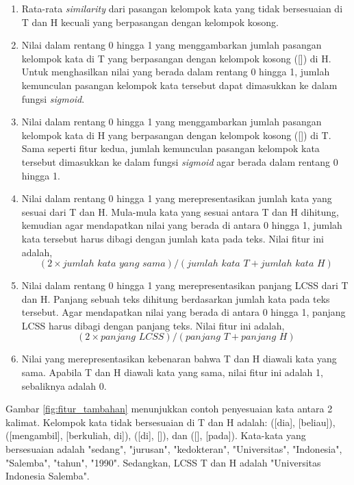 	\begin{enumerate}
		\item Rata-rata \textit{similarity} dari pasangan kelompok kata yang tidak bersesuaian di T dan H kecuali yang berpasangan dengan kelompok kosong. 		
		\item Nilai dalam rentang 0 hingga 1 yang menggambarkan jumlah pasangan kelompok kata di T yang berpasangan dengan kelompok kosong ([]) di H. Untuk menghasilkan nilai yang berada dalam rentang 0 hingga 1, jumlah kemunculan pasangan kelompok kata tersebut dapat dimasukkan ke dalam fungsi \textit{sigmoid}.
		\item Nilai dalam rentang 0 hingga 1 yang menggambarkan jumlah pasangan kelompok kata di H yang berpasangan dengan kelompok kosong ([]) di T. Sama seperti fitur kedua, jumlah kemunculan pasangan kelompok kata tersebut dimasukkan ke dalam fungsi \textit{sigmoid} agar berada dalam rentang 0 hingga 1. 
		\item Nilai dalam rentang 0 hingga 1 yang merepresentasikan jumlah kata yang sesuai dari T dan H. Mula-mula kata yang sesuai antara T dan H dihitung, kemudian agar mendapatkan nilai yang berada di antara 0 hingga 1, jumlah kata tersebut harus dibagi dengan jumlah kata pada teks. Nilai fitur ini adalah,
		\begin{equation}
		(2 \times jumlah\,\,kata\,\,yang\,\,sama)/(jumlah\,\,kata\,\,T + jumlah\,\,kata\,\,H)
		\end{equation}
		\item Nilai dalam rentang 0 hingga 1 yang merepresentasikan panjang LCSS dari T dan H. Panjang sebuah teks dihitung berdasarkan jumlah kata pada teks tersebut. Agar mendapatkan nilai yang berada di antara 0 hingga 1, panjang LCSS harus dibagi dengan panjang teks. Nilai fitur ini adalah,
		\begin{equation}
			(2 \times panjang\,\,LCSS)/(panjang\,\,T + panjang\,\,H)
		\end{equation}		
		\item Nilai yang merepresentasikan kebenaran bahwa T dan H diawali kata yang sama. Apabila T dan H diawali kata yang sama, nilai fitur ini adalah 1, sebaliknya adalah 0.
	\end{enumerate}	
	Gambar \ref{fig:fitur_tambahan} menunjukkan contoh penyesuaian kata antara 2 kalimat. Kelompok kata tidak bersesuaian di T dan H adalah: ([dia], [beliau]), ([mengambil], [berkuliah, di]), ([di], []), dan  ([], [pada]). Kata-kata yang bersesuaian adalah "sedang", "jurusan", "kedokteran", "Universitas", "Indonesia", "Salemba", "tahun", "1990". Sedangkan, LCSS T dan H adalah "Universitas Indonesia Salemba". 
